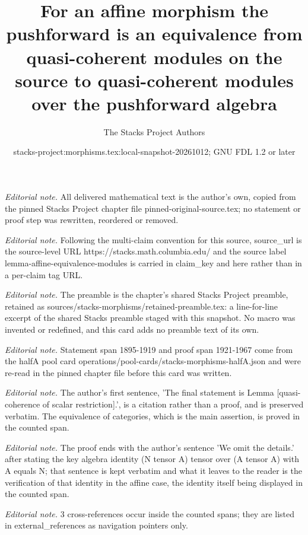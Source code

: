 \documentclass[10pt,a4paper]{amsart}
\title{For an affine morphism the pushforward is an equivalence from quasi-coherent modules on the source to quasi-coherent modules over the pushforward algebra}
\author{The Stacks Project Authors}
\date{stacks-project:morphisms.tex:local-snapshot-20261012; GNU FDL 1.2 or later}
\theoremstyle{plain}
\theoremstyle{definition}
\theoremstyle{remark}
\numberwithin{equation}{subsection}
\begin{document}
\maketitle
\noindent\textit{Editorial note.} All delivered mathematical text is the author's own, copied from the pinned Stacks Project chapter file pinned-original-source.tex; no statement or proof step was rewritten, reordered or removed.\par\medskip
\noindent\textit{Editorial note.} Following the multi-claim convention for this source, source\_url is the source-level URL https://stacks.math.columbia.edu/ and the source label lemma-affine-equivalence-modules is carried in claim\_key and here rather than in a per-claim tag URL.\par\medskip
\noindent\textit{Editorial note.} The preamble is the chapter's shared Stacks Project preamble, retained as sources/stacks-morphisms/retained-preamble.tex: a line-for-line excerpt of the shared Stacks preamble staged with this snapshot. No macro was invented or redefined, and this card adds no preamble text of its own.\par\medskip
\noindent\textit{Editorial note.} Statement span 1895-1919 and proof span 1921-1967 come from the halfA pool card operations/pool-cards/stacks-morphisms-halfA.json and were re-read in the pinned chapter file before this card was written.\par\medskip
\noindent\textit{Editorial note.} The author's first sentence, 'The final statement is Lemma [quasi-coherence of scalar restriction].', is a citation rather than a proof, and is preserved verbatim. The equivalence of categories, which is the main assertion, is proved in the counted span.\par\medskip
\noindent\textit{Editorial note.} The proof ends with the author's sentence 'We omit the details.' after stating the key algebra identity (N tensor A) tensor over (A tensor A) with A equals N; that sentence is kept verbatim and what it leaves to the reader is the verification of that identity in the affine case, the identity itself being displayed in the counted span.\par\medskip
\noindent\textit{Editorial note.} 3 cross-references occur inside the counted spans; they are listed in external\_references as navigation pointers only.\par\medskip
\end{document}
